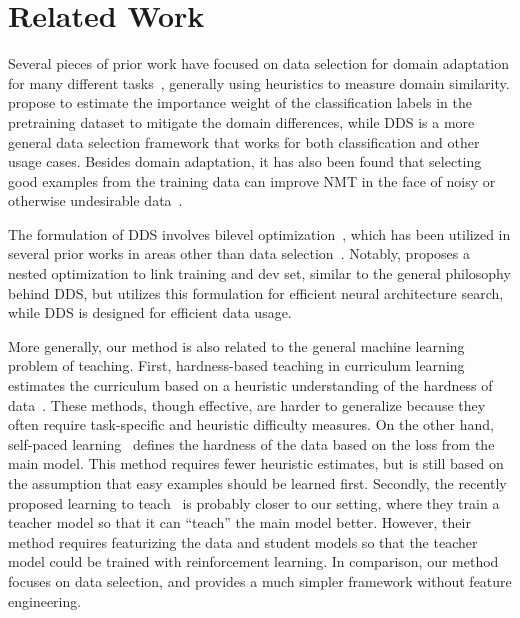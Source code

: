 \section{\label{sec:related_work}Related Work}

Several pieces of prior work have focused on data selection for domain adaptation for many different tasks~\citep{moore2010intelligent,axelrod2011domain,domain_adapt_transfer,jiang-zhai-2007-instance,foster-etal-2010-discriminative,wang-etal-2017-instance}, generally using heuristics to measure domain similarity.
\cite{domain_adapt_transfer} propose to estimate the importance weight of the classification labels in the pretraining dataset to mitigate the domain differences, while DDS is a more general data selection framework that works for both classification and other usage cases.
Besides domain adaptation, it has also been found that selecting good examples from the training data can improve NMT in the face of noisy or otherwise undesirable data~\citep{vyas-etal-2018-identifying,pham-etal-2018-fixing}.  

The formulation of DDS involves bilevel optimization~\citep{bilevel_optim,hier_optim}, which has been utilized in several prior works in areas other than data selection~\citep{darts,hyper_grad,finn2017model}.
Notably, \cite{darts} proposes a nested optimization to link training and dev set, similar to the general philosophy behind DDS, but utilizes this formulation for efficient neural architecture search, while DDS is designed for efficient data usage.

More generally, our method is also related to the general machine learning problem of teaching. First, hardness-based teaching in curriculum learning estimates the curriculum based on a heuristic understanding of the hardness of data~\citep{cl_bengio,automate_cl_GravesBMMK17,SpitkovskyAJ10,zhang2016boosting,zhang2018empirical,platanios19naacl,baysian_curriculum}. These methods, though effective, are harder to generalize because they often require task-specific and heuristic difficulty measures. On the other hand, self-paced learning~\citep{spl_visual_category,spl_kumar,spl_visual_category} defines the hardness of the data based on the loss from the main model. This method requires fewer heuristic estimates, but is still based on the assumption that easy examples should be learned first. Secondly, the recently proposed learning to teach~\citep{learn_to_teach} is probably closer to our setting, where they train a teacher model so that it can ``teach'' the main model better. However, their method requires featurizing the data and student models so that the teacher model could be trained with reinforcement learning. In comparison, our method focuses on data selection, and provides a much simpler framework without feature engineering. 


